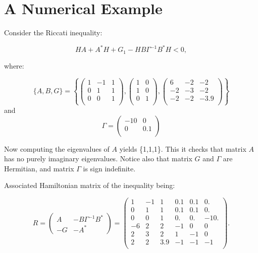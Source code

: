 \documentclass[11pt, reqno]{amsart}
\theoremstyle{plain}
\begin{document}
\section{A Numerical Example}


Consider the Riccati inequality:

\begin{equation}\label{ex} 
HA + A^{*} H + G_{1} - H B\Gamma ^{-1}B^{*}H < 0,
\end{equation}

where:

\noindent \begin{equation}
\{A, B, G \} = \left\{\left(
\begin{array}{ccc}
 1 & -1 & 1 \\
 0 & 1 & 1 \\
 0 & 0 & 1 \\
\end{array}
\right), \left(
\begin{array}{cc}
 1 & 0 \\
 1 & 0 \\
 0 & 1 \\
\end{array}
\right), \left(
\begin{array}{ccc}
 6 & -2 & -2 \\
 -2 & -3 & -2 \\
 -2 & -2 & -3.9 \\
\end{array}
\right)\right\}
\end{equation}
 and 
\[
\Gamma =\left (\begin{array}{cc}
 -10 & 0 \\
 0 & 0.1 \\
\end{array}\right)
\]





Now computing the eigenvalues of $A$ yields \{1,1,1\}. This it checks that matrix $A$ has no purely imaginary eigenvalues. Notice also that matrix $G$ and $\Gamma$ are Hermitian, and matrix $\Gamma$ is sign indefinite.







\noindent Associated Hamiltonian matrix of the inequality being:

\begin{equation} 
R = \left(\begin{array}{cc}
A&-B\Gamma ^{-1}B^{*} \\
 -G &-A^{*}\end{array}\right) = 
 \left(\begin{array}{cccccc}
 1 & -1 & 1 & 0.1 & 0.1 & 0. \\
 0 & 1 & 1 & 0.1 & 0.1 & 0. \\
 0 & 0 & 1 & 0. & 0. & -10. \\
 -6 & 2 & 2 & -1 & 0 & 0 \\
 2 & 3 & 2 & 1 & -1 & 0 \\
 2 & 2 & 3.9 & -1 & -1 & -1 \\
\end{array}\right).
\end{equation}
\end{document}
